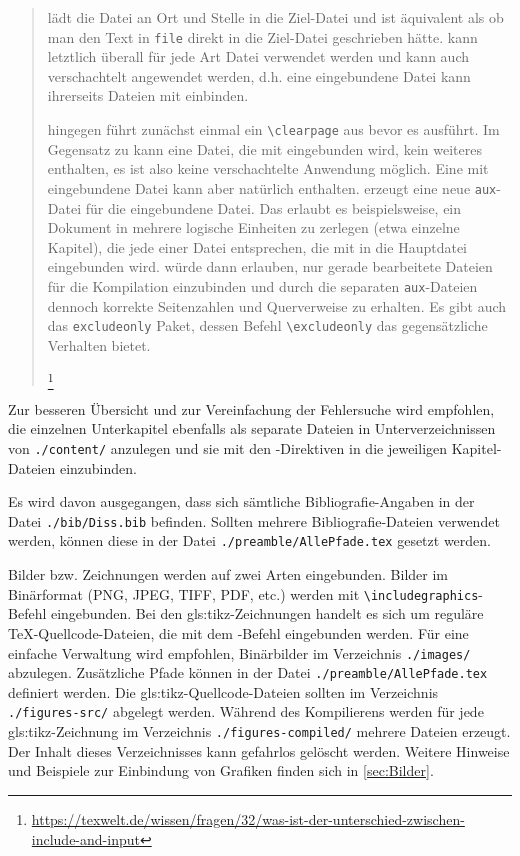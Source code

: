 \begin{quote}
{\small
\verb++ lädt die Datei an Ort und Stelle in die Ziel-Datei und ist äquivalent
als ob man den Text in \texttt{file} direkt in die Ziel-Datei geschrieben hätte.
\verb++ kann letztlich überall für jede Art Datei verwendet werden und kann auch verschachtelt angewendet werden,
d.h. eine eingebundene Datei kann ihrerseits Dateien mit \verb++ einbinden.

\verb++ hingegen führt zunächst einmal ein \verb+\clearpage+ aus bevor es \verb++ ausführt.
Im Gegensatz zu \verb++ kann eine Datei, die mit \verb++ eingebunden wird,
kein weiteres \verb++ enthalten, es ist also keine verschachtelte Anwendung möglich.
Eine mit \verb++ eingebundene Datei kann aber natürlich \verb++ enthalten.
\verb++ erzeugt eine neue \texttt{aux}-Datei für die eingebundene Datei.
Das erlaubt es beispielsweise, ein Dokument in mehrere logische Einheiten zu zerlegen (etwa einzelne Kapitel),
die jede einer Datei entsprechen, die mit \verb++ in die Hauptdatei eingebunden wird.
\verb++ würde dann erlauben, nur gerade bearbeitete Dateien für die Kompilation einzubinden
und durch die separaten \texttt{aux}-Dateien dennoch korrekte Seitenzahlen und Querverweise zu erhalten.
Es gibt auch das \texttt{excludeonly} Paket, dessen Befehl \verb+\excludeonly+ das gegensätzliche Verhalten bietet.%
}%
\footnote{\url{https://texwelt.de/wissen/fragen/32/was-ist-der-unterschied-zwischen-include-and-input}}
\end{quote}

Zur besseren Übersicht und zur Vereinfachung der Fehlersuche wird empfohlen,
die einzelnen Unterkapitel ebenfalls als separate Dateien in Unterverzeichnissen von \texttt{./content/} anzulegen
und sie mit den \verb++-Direktiven in die jeweiligen Kapitel-Dateien einzubinden.

Es wird davon ausgegangen, dass sich sämtliche Bibliografie-Angaben in der Datei
\texttt{./bib/Diss.bib} befinden.
Sollten mehrere Bibliografie-Dateien verwendet werden, können diese in der Datei
\texttt{./preamble/AllePfade.tex} gesetzt werden.

Bilder bzw. Zeichnungen werden auf zwei Arten eingebunden.
Bilder im Binärformat (PNG, JPEG, TIFF, PDF, etc.)
werden mit \verb+\includegraphics+-Befehl eingebunden. 
Bei den \gls{gls:tikz}-Zeichnungen handelt es sich um reguläre TeX-Quellcode-Dateien,
die mit dem \verb++-Befehl eingebunden werden.
Für eine einfache Verwaltung wird empfohlen, Binärbilder im Verzeichnis \texttt{./images/} abzulegen.
Zusätzliche Pfade können in der Datei \texttt{./preamble/AllePfade.tex} definiert werden.
Die \gls{gls:tikz}-Quellcode-Dateien sollten im Verzeichnis \texttt{./figures-src/} abgelegt werden.
Während des Kompilierens werden für jede \gls{gls:tikz}-Zeichnung im Verzeichnis \texttt{./figures-compiled/} mehrere Dateien erzeugt.
Der Inhalt dieses Verzeichnisses kann gefahrlos gelöscht werden.
Weitere Hinweise und Beispiele zur Einbindung von Grafiken finden sich in \cref{sec:Bilder}.

